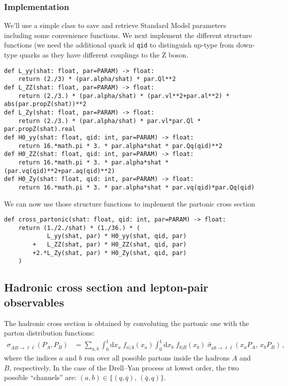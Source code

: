 \documentclass[11pt]{article}
\begin{document}
\subsubsection{Implementation}
\label{sec:org1183aa5}
We'll use a simple class to save and retrieve Standard Model parameters including some convenience functions.
We next implement the different structure functions (we need the additional quark id \texttt{qid} to distinguish up-type from down-type quarks as they have different couplings to the Z boson.
\begin{verbatim}
def L_yy(shat: float, par=PARAM) -> float:
    return (2./3) * (par.alpha/shat) * par.Ql**2
def L_ZZ(shat: float, par=PARAM) -> float:
    return (2./3.) * (par.alpha/shat) * (par.vl**2+par.al**2) * abs(par.propZ(shat))**2
def L_Zy(shat: float, par=PARAM) -> float:
    return (2./3.) * (par.alpha/shat) * par.vl*par.Ql * par.propZ(shat).real
def H0_yy(shat: float, qid: int, par=PARAM) -> float:
    return 16.*math.pi * 3. * par.alpha*shat * par.Qq(qid)**2
def H0_ZZ(shat: float, qid: int, par=PARAM) -> float:
    return 16.*math.pi * 3. * par.alpha*shat * (par.vq(qid)**2+par.aq(qid)**2)
def H0_Zy(shat: float, qid: int, par=PARAM) -> float:
    return 16.*math.pi * 3. * par.alpha*shat * par.vq(qid)*par.Qq(qid)
\end{verbatim}
We can now use those structure functions to implement the partonic cross section
\begin{verbatim}
def cross_partonic(shat: float, qid: int, par=PARAM) -> float:
    return (1./2./shat) * (1./36.) * (
            L_yy(shat, par) * H0_yy(shat, qid, par)
        +   L_ZZ(shat, par) * H0_ZZ(shat, qid, par)
        +2.*L_Zy(shat, par) * H0_Zy(shat, qid, par)
    )
\end{verbatim}

\subsection{Hadronic cross section and lepton-pair observables}
\label{sec:orgbd14008}
The hadronic cross section is obtained by convoluting the partonic one with the parton distribution functions:
\begin{align}
  \sigma_{A B \to \ell\bar{\ell}} (P_A, P_B)
  &=
  \sum_{a,b}
  \int_0^1\mathrm{d}x_a \; f_{a\vert A}(x_a)
  \int_0^1\mathrm{d}x_b \; f_{b\vert B}(x_b) \;
  \hat{\sigma}_{ab\to\ell\bar{\ell}}(x_a P_A,\,x_b P_B)
  \,,
\end{align}
where the indices \(a\) and \(b\) run over all possible partons inside the hadrons \(A\) and \(B\), respectively.
In the case of the Drell--Yan process at lowest order, the two possible ``channels'' are:  \((a,b) \in \{(q,\bar{q}),\,(\bar{q},q)\}\).
\end{document}
